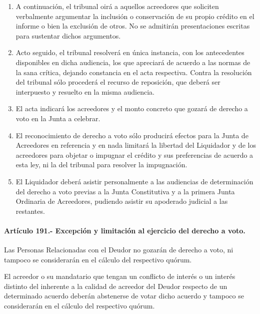 \documentclass[
]{book}
\begin{document}
\begin{enumerate}
\def\labelenumi{\arabic{enumi})}
\setcounter{enumi}{3}
\item
  A continuación, el tribunal oirá a aquellos acreedores que soliciten verbalmente argumentar la inclusión o conservación de su propio crédito en el informe o bien la exclusión de otros. No se admitirán presentaciones escritas para sustentar dichos argumentos.
\item
  Acto seguido, el tribunal resolverá en única instancia, con los antecedentes disponibles en dicha audiencia, los que apreciará de acuerdo a las normas de la sana crítica, dejando constancia en el acta respectiva. Contra la resolución del tribunal sólo procederá el recurso de reposición, que deberá ser interpuesto y resuelto en la misma audiencia.
\item
  El acta indicará los acreedores y el monto concreto que gozará de derecho a voto en la Junta a celebrar.
\item
  El reconocimiento de derecho a voto sólo producirá efectos para la Junta de Acreedores en referencia y en nada limitará la libertad del Liquidador y de los acreedores para objetar o impugnar el crédito y sus preferencias de acuerdo a esta ley, ni la del tribunal para resolver la impugnación.
\item
  El Liquidador deberá asistir personalmente a las audiencias de determinación del derecho a voto previas a la Junta Constitutiva y a la primera Junta Ordinaria de Acreedores, pudiendo asistir su apoderado judicial a las restantes.
\end{enumerate}

\hypertarget{artuxedculo-191.--excepciuxf3n-y-limitaciuxf3n-al-ejercicio-del-derecho-a-voto.}{%
\paragraph*{Artículo 191.- Excepción y limitación al ejercicio del derecho a voto.}\label{artuxedculo-191.--excepciuxf3n-y-limitaciuxf3n-al-ejercicio-del-derecho-a-voto.}}

Las Personas Relacionadas con el Deudor no gozarán de derecho a voto, ni tampoco se considerarán en el cálculo del respectivo quórum.

El acreedor o su mandatario que tengan un conflicto de interés o un interés distinto del inherente a la calidad de acreedor del Deudor respecto de un determinado acuerdo deberán abstenerse de votar dicho acuerdo y tampoco se considerarán en el cálculo del respectivo quórum.
\end{document}
